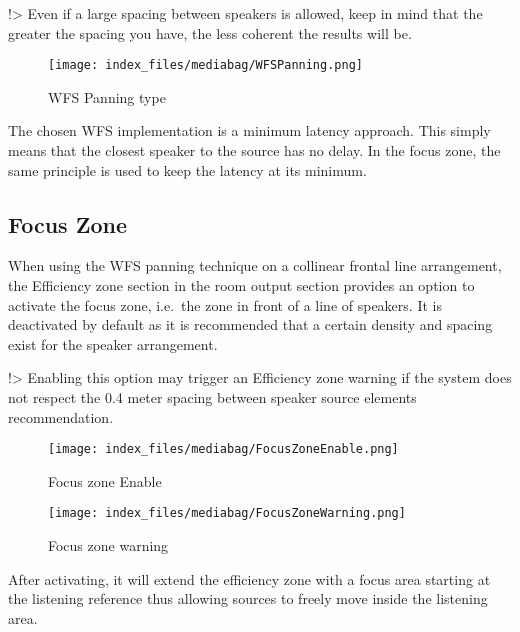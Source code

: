 \documentclass[
  letterpaper,
  DIV=11,
  numbers=noendperiod]{scrreport}
\begin{document}
!\textgreater{} Even if a large spacing between speakers is allowed,
keep in mind that the greater the spacing you have, the less coherent
the results will be.

\begin{figure}

{\centering \texttt{[image: index\_files/mediabag/WFSPanning.png]}

}

\caption{WFS Panning type}

\end{figure}

The chosen WFS implementation is a minimum latency approach. This simply
means that the closest speaker to the source has no delay. In the focus
zone, the same principle is used to keep the latency at its minimum.

\hypertarget{focus-zone}{%
\subsection{Focus Zone}\label{focus-zone}}

When using the WFS panning technique on a collinear frontal line
arrangement, the Efficiency zone section in the room output section
provides an option to activate the focus zone, i.e.~the zone in front of
a line of speakers. It is deactivated by default as it is recommended
that a certain density and spacing exist for the speaker arrangement.

!\textgreater{} Enabling this option may trigger an Efficiency zone
warning if the system does not respect the 0.4 meter spacing between
speaker source elements recommendation.

\begin{figure}

{\centering \texttt{[image: index\_files/mediabag/FocusZoneEnable.png]}

}

\caption{Focus zone Enable}

\end{figure}

\begin{figure}

{\centering \texttt{[image: index\_files/mediabag/FocusZoneWarning.png]}

}

\caption{Focus zone warning}

\end{figure}

After activating, it will extend the efficiency zone with a focus area
starting at the listening reference thus allowing sources to freely move
inside the listening area.
\end{document}
